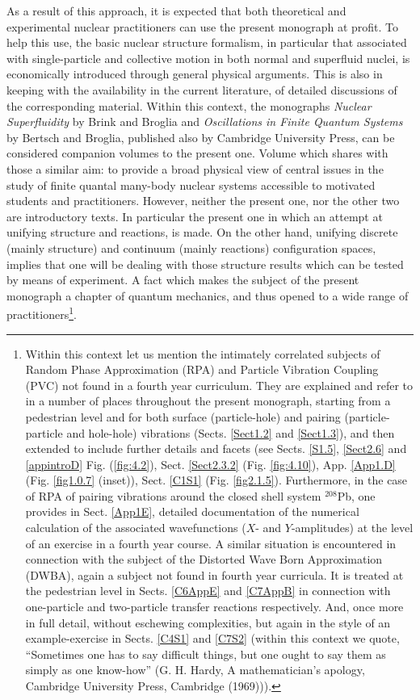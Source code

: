 As a result of this approach, it is expected that both theoretical and experimental nuclear practitioners can use the present monograph at profit. To help this use, the basic nuclear structure formalism, in particular that associated with single-particle and collective motion in both normal and superfluid nuclei, is economically introduced through general physical arguments. This is also in keeping with the availability in the current literature, of detailed discussions of the corresponding material. Within this context, the monographs \emph{Nuclear Superfluidity} by Brink and Broglia and \emph{Oscillations in Finite Quantum Systems}  by Bertsch and Broglia, published also by Cambridge University Press, can be considered companion volumes to the present one. Volume which shares with those a similar aim: to provide a broad physical view of central issues in the study of finite quantal many-body nuclear systems accessible to motivated students and practitioners. However, neither the present one, nor the other two are introductory texts. In particular the present one in which an attempt at unifying structure and reactions, is made. On the other hand, unifying discrete (mainly structure) and continuum  (mainly reactions) configuration spaces, implies that one will be dealing with those structure results which can be tested by means of experiment. A fact which makes the subject of the present monograph a chapter of quantum mechanics, and thus opened to a wide range of practitioners\footnote{Within this context let us mention the intimately correlated subjects of Random Phase Approximation (RPA) and Particle Vibration Coupling (PVC) not found in a fourth year curriculum. They are explained and refer to in a number of places throughout the present monograph, starting from a pedestrian level and for both surface (particle-hole) and pairing (particle-particle and hole-hole) vibrations (Sects. \ref{Sect1.2} and \ref{Sect1.3}), and then extended to include further details and facets (see Sects. \ref{S1.5}, \ref{Sect2.6} and \ref{appintroD} Fig. (\ref{fig:4.2}), Sect. \ref{Sect2.3.2} (Fig. \ref{fig:4.10}), App. \ref{App1.D} (Fig. \ref{fig1.0.7} (inset)), Sect. \ref{C1S1} (Fig. \ref{fig2.1.5}). Furthermore, in the case of RPA of pairing vibrations around the closed shell system $^{208}$Pb, one provides in Sect. \ref{App1E}, detailed documentation of the numerical calculation of the associated wavefunctions ($X$- and $Y$-amplitudes) at the level of an exercise in a fourth year course. A similar situation is encountered in connection with the subject of the Distorted Wave Born Approximation (DWBA), again a subject not found in fourth year curricula. It is treated at the pedestrian level in Sects. \ref{C6AppE} and \ref{C7AppB} in connection with one-particle and two-particle transfer reactions respectively. And,  once more in full detail, without eschewing complexities, but again in the style of an example-exercise  in Sects. \ref{C4S1} and \ref{C7S2} (within this context we quote, ``Sometimes one has to say difficult things, but one ought to say them as simply as one know-how'' (G. H. Hardy, A mathematician's apology, Cambridge University Press, Cambridge (1969))).}.

